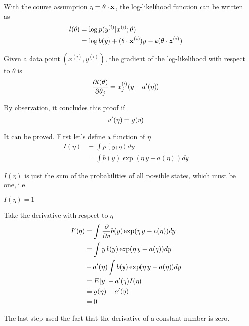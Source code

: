 \documentclass[main]{subfiles}
\begin{document}
With the course assumption $\eta = \mathbf{\theta}\cdot\mathbf{x}$, the log-likelihood
function can be written as
\begin{align*}
	l(\theta)
		&=
			\log p(y^{(i)}|x^{(i)};\theta) 		\\
		&=
			\log b(y) +
			(\mathbf{\theta}\cdot\mathbf{x}^{(i)}) y - a(\mathbf{\theta}\cdot\mathbf{x}^{(i)})
\end{align*}

Given a data point $(x^{(i)}, y^{(i)})$, the gradient of the log-likelihood with
respect to $\theta$ is
\begin{align*}
	\frac{\partial l(\theta)}{\partial \theta_j}
		=
			x^{(i)}_j (
				y - a^{\prime}(\eta)
			)
\end{align*}

By observation, it concludes this proof if
\begin{align*}
	a^{\prime}(\eta) = g(\eta)
\end{align*}

It can be proved. First let's define a function of $\eta$
\begin{align*}
	I(\eta)
		&=
			\int
			p(y;\eta)
			dy 									\\
		&=
			\int
			b(y) \exp ( \eta \, y - a(\eta) )
			dy
\end{align*}

$I(\eta)$ is just the sum of the probabilities of all possible states, which
must be one, i.e.
\begin{center}
\begin{math}
	I(\eta) = 1
\end{math}
\end{center}

Take the derivative with respect to $\eta$
\begin{align*}
	I^{\prime}(\eta)
		&=
			\int
			\frac{\partial }{\partial \eta}
			b(y) \exp ( \eta \, y - a(\eta) )
			dy 									\\
		&=
			\int
			y \, b(y) \exp ( \eta \, y - a(\eta) )
			dy 									\\
		&-
			a^{\prime}(\eta)
			\int
			b(y) \exp ( \eta \, y - a(\eta) )
			dy 									\\
		&=
			E[y]
			- a^{\prime}(\eta) I(\eta)				\\
		&=
			g(\eta)
			- a^{\prime}(\eta) 						\\
		&=
			0
\end{align*}

The last step used the fact that the derivative of a constant number is zero.


\end{document}
